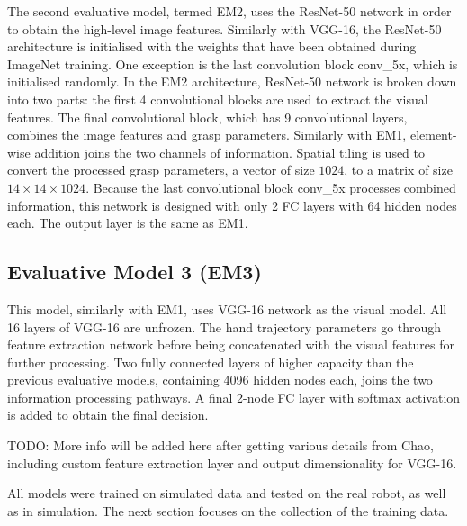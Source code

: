 The second evaluative model, termed EM2, uses the ResNet-50 network in order to obtain the high-level image features. Similarly with VGG-16, the ResNet-50 architecture is initialised with the weights that have been obtained during ImageNet training. One exception is the last convolution block conv\_5x, which is initialised randomly. In the EM2 architecture, ResNet-50 network is broken down into two parts: the first 4 convolutional blocks are used to extract the visual features. The final convolutional block, which has 9 convolutional layers, combines the image features and grasp parameters. Similarly with EM1, element-wise addition joins the two channels of information. Spatial tiling is used to convert the processed grasp parameters, a vector of size $1024$, to a matrix of size $14 \times 14 \times 1024$. Because the last convolutional block conv\_5x processes combined information, this network is designed with only 2 FC layers with 64 hidden nodes each. The output layer is the same as EM1. 

\subsection{Evaluative Model 3 (EM3)}

This model, similarly with EM1, uses VGG-16 network as the visual model. All 16 layers of VGG-16 are unfrozen. The hand trajectory parameters go through feature extraction network before being concatenated with the visual features for further processing. Two fully connected layers of higher capacity than the previous evaluative models, containing 4096 hidden nodes each, joins the two information processing pathways. A final 2-node FC layer with softmax activation is added to obtain the final decision.

TODO: More info will be added here after getting various details from Chao, including custom feature extraction layer and output dimensionality for VGG-16.

All models were trained on simulated data and tested on the real robot, as well as in simulation. The next section focuses on the collection of the training data.